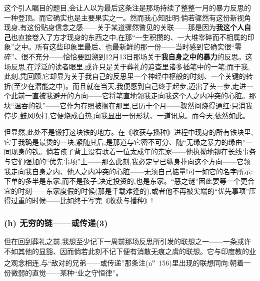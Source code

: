 这个引人瞩目的题目,会让人以为最后这条注是那场持续了整整一月的暴力反思的一种登顶。而它确实也是主要果实之一。然而我心知肚明:倘若骤然有这份新视角现身,有这份贴身信念之感——关于某道骤然瞥见的关联——那是因为\textbf{我这个人自己}也直接卷入了方才现身的东西之中,在那“一生积攒的、一大堆零碎而不相属的印象”之中。所有这些印象里最后、也最新鲜的那一份——当时感到它确实很“零碎”、很不充分——恰恰要回溯到12月13日那场关于\textbf{我自身之中的暴力}的反思。这场反思,在浮泛的读者眼里,或许只是关于葬礼的追查里诸多插笔中的一笔;而于我,此刻,凭回顾,它却显为关于我自己的反思里一个神经中枢般的时刻、一个关键的转折(至少在潜能之中)。而且就在当天,我便感到自己终于起步,迈出了头一步,走进一个此前一直被我避开的方向——它将笔直地领我走向我这个人之内冲突的心脏。那块“温吞的铁”——它作为存照被搁在那里,已历十个月——骤然间烧得通红:只消我停步,鼓风吹打,它便烧成白热,向我显出一份形状、一道讯息。而今天,依然如此。

但显然,此处不是锻打这块铁的地方。在《收获与播种》进程中现身的所有铁块里,它于我确是最烫的一块;紧随其后,是那道与它密不可分、随“无缘之暴力的缘由”一同现身的铁。倘若孩子背上没有驮着一位太成年的东家——他执拗地铆在长线事务与它们强加的“优先事项”上——那么此刻\dmark{},我必定早已纵身扑向这个方向——它领我走向我自身之内、他人之内冲突的心脏——无须自己掂量!可一如它的名字所示:下单的多半是东家,而不是孩子;决定投资的,也是东家。“恶之谜”因此要等一个更合宜的时刻——东家度假的时候(那是千载难逢的),或者他不再被尖端的“优先事项”压得过重的时候——比如终于写完《收获与播种》!

\subsubsection*{(h) 无穷的链——或传递(3)}
\label{ch18:local:h78}

\label{ch18:local:n73}

但在回到葬礼之前,我想至少记下一周前那场反思所引发的联想之一——一条或许不如其他的显豁、因而倘若此刻不记下便有消散无痕之虞的联想。它与印度教的业之观念相连,与“敌对的兄弟——或传递”那条注(n\textsuperscript{o}~156)里出现的联想同向:朝着一份微弱的直觉——某种“业之守恒律”。

